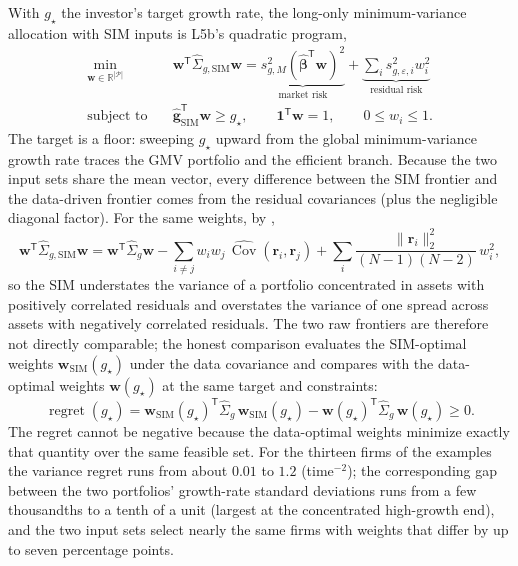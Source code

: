 \documentclass[11pt]{article}
\newcommand{\R}{\mathbb{R}}
\newcommand{\Cov}{\operatorname{Cov}}
\newcommand{\np}{|\mathcal P|}
\newcommand{\bw}{\mathbf w}
\newcommand{\bg}{\mathbf g}
\newcommand{\bbe}{\boldsymbol\beta}
\newcommand{\br}{\mathbf r}
\newcommand{\SigSIM}{\hat\Sigma_{g,\mathrm{SIM}}}
\newcommand{\gSIM}{\hat{\bg}_{\mathrm{SIM}}}
\begin{document}
With $g_\star$ the investor's target growth rate, the long-only minimum-variance allocation with SIM inputs is L5b's quadratic program,
\begin{equation}
  \label{eq:risky-qp}
  \begin{aligned}
  \min_{\bw\in\R^{\np}}\quad &\bw^{\mathsf T}\SigSIM\bw
    =\underbrace{s^2_{g,M}(\hat{\bbe}^{\mathsf T}\bw)^2}_{\text{market risk}}
    +\underbrace{\textstyle\sum_i s^2_{g,\varepsilon,i}w_i^2}_{\text{residual risk}}\\
  \text{subject to}\quad
    &\gSIM^{\mathsf T}\bw\geq g_\star,\qquad
    \mathbf 1^{\mathsf T}\bw=1,\qquad
    0\le w_i\le1 .
  \end{aligned}
\end{equation}
The target is a floor: sweeping $g_\star$ upward from the global minimum-variance growth rate traces the GMV portfolio and the efficient branch. Because the two input sets share the mean vector, every difference between the SIM frontier and the data-driven frontier comes from the residual covariances (plus the negligible diagonal factor). For the same weights, by ,
\begin{equation}
  \label{eq:variance-gap}
  \bw^{\mathsf T}\SigSIM\bw
  =\bw^{\mathsf T}\hat\Sigma_g\bw
  -\sum_{i\ne j}w_iw_j\,\widehat{\Cov}(\br_i,\br_j)
  +\sum_i\frac{\lVert\br_i\rVert_2^2}{(N-1)(N-2)}\,w_i^2,
\end{equation}
so the SIM understates the variance of a portfolio concentrated in assets with positively correlated residuals and overstates the variance of one spread across assets with negatively correlated residuals. The two raw frontiers are therefore not directly comparable; the honest comparison evaluates the SIM-optimal weights $\bw_{\mathrm{SIM}}(g_\star)$ under the data covariance and compares with the data-optimal weights $\bw(g_\star)$ at the same target and constraints:
\begin{equation}
  \label{eq:regret}
  \operatorname{regret}(g_\star)
  =\bw_{\mathrm{SIM}}(g_\star)^{\mathsf T}\hat\Sigma_g\,\bw_{\mathrm{SIM}}(g_\star)
  -\bw(g_\star)^{\mathsf T}\hat\Sigma_g\,\bw(g_\star)\geq0 .
\end{equation}
The regret cannot be negative because the data-optimal weights minimize exactly that quantity over the same feasible set. For the thirteen firms of the examples the variance regret runs from about $0.01$ to $1.2$ (time$^{-2}$); the corresponding gap between the two portfolios' growth-rate standard deviations runs from a few thousandths to a tenth of a unit (largest at the concentrated high-growth end), and the two input sets select nearly the same firms with weights that differ by up to seven percentage points.
\end{document}
